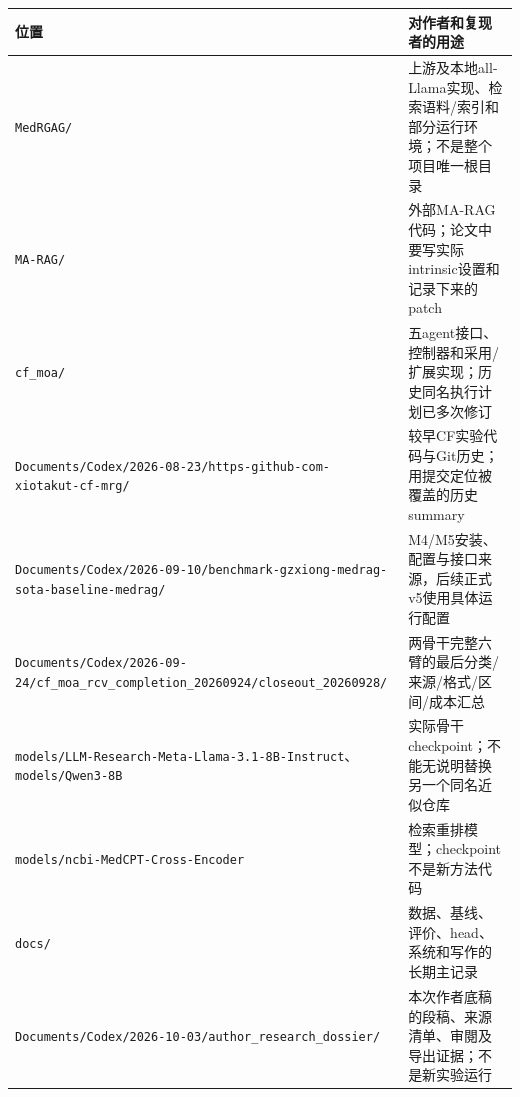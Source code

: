 \documentclass[
  11pt,
  a4paper,
]{article}
\newcounter{none} %
\begin{document}
{\def\LTcaptype{none} %
\begin{longtable}[]{@{}
  >{\raggedright\arraybackslash}p{}
  >{\raggedright\arraybackslash}p{}@{}}
\toprule\noalign{}
\begin{minipage}[b]{\linewidth}\raggedright
位置
\end{minipage} & \begin{minipage}[b]{\linewidth}\raggedright
对作者和复现者的用途
\end{minipage} \\
\midrule\noalign{}
\endhead
\bottomrule\noalign{}
\endlastfoot
\texttt{MedRGAG/\allowbreak{}} &
上游及本地all-Llama实现、检索语料/索引和部分运行环境；不是整个项目唯一根目录 \\
\texttt{MA-\allowbreak{}RAG/\allowbreak{}} &
外部MA-RAG代码；论文中要写实际intrinsic设置和记录下来的patch \\
\texttt{cf\_\allowbreak{}moa/\allowbreak{}} &
五agent接口、控制器和采用/扩展实现；历史同名执行计划已多次修订 \\
\texttt{Documents/\allowbreak{}Codex/\allowbreak{}2026-\allowbreak{}08-\allowbreak{}23/\allowbreak{}https-\allowbreak{}github-\allowbreak{}com-\allowbreak{}xiotakut-\allowbreak{}cf-\allowbreak{}mrg/\allowbreak{}}
& 较早CF实验代码与Git历史；用提交定位被覆盖的历史summary \\
\texttt{Documents/\allowbreak{}Codex/\allowbreak{}2026-\allowbreak{}09-\allowbreak{}10/\allowbreak{}benchmark-\allowbreak{}gzxiong-\allowbreak{}medrag-\allowbreak{}sota-\allowbreak{}baseline-\allowbreak{}medrag/\allowbreak{}}
& M4/M5安装、配置与接口来源，后续正式v5使用具体运行配置 \\
\texttt{Documents/\allowbreak{}Codex/\allowbreak{}2026-\allowbreak{}09-\allowbreak{}24/\allowbreak{}cf\_\allowbreak{}moa\_\allowbreak{}rcv\_\allowbreak{}completion\_\allowbreak{}20260924/\allowbreak{}closeout\_\allowbreak{}20260928/\allowbreak{}}
& 两骨干完整六臂的最后分类/来源/格式/区间/成本汇总 \\
\texttt{models/\allowbreak{}LLM-\allowbreak{}Research-\allowbreak{}Meta-\allowbreak{}Llama-\allowbreak{}3.\allowbreak{}1-\allowbreak{}8B-\allowbreak{}Instruct}、\texttt{models/\allowbreak{}Qwen3-\allowbreak{}8B}
& 实际骨干checkpoint；不能无说明替换另一个同名近似仓库 \\
\texttt{models/\allowbreak{}ncbi-\allowbreak{}MedCPT-\allowbreak{}Cross-\allowbreak{}Encoder}
& 检索重排模型；checkpoint不是新方法代码 \\
\texttt{docs/\allowbreak{}} &
数据、基线、评价、head、系统和写作的长期主记录 \\
\texttt{Documents/\allowbreak{}Codex/\allowbreak{}2026-\allowbreak{}10-\allowbreak{}03/\allowbreak{}author\_\allowbreak{}research\_\allowbreak{}dossier/\allowbreak{}}
& 本次作者底稿的段稿、来源清单、审閱及导出证据；不是新实验运行 \\
\end{longtable}
}
\end{document}
